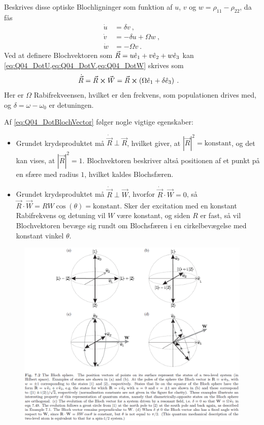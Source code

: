 Beskrives disse optiske Blochligninger som funktion af $u$, $v$ og $w = \rho_{11} - \rho_{22}$, da fås
\begin{align}
    \Dot{u} &= \delta v \: , \label{eq:Q04_DotU} \\
    \Dot{v} &= -\delta u + \Omega w \: , \label{eq:Q04_DotV} \\
    \Dot{w} &= -\Omega v \: . \label{eq:Q04_DotW}
\end{align}
Ved at definere \textsf{Blochvektoren} som $\Vec{R} = u\Hat{e}_1 + v\Hat{e}_2 + w\Hat{e}_3$ kan \cref{eq:Q04_DotU,eq:Q04_DotV,eq:Q04_DotW} skrives som
\begin{align} \label{eq:Q04_DotBlochVector}
    \Dot{\Vec{R}} &= \Vec{R} \cross \Vec{W} = \Vec{R} \cross \left(\Omega\Hat{e}_1 + \delta\Hat{e}_3\right) \: .
\end{align}
Her er $\Omega$ Rabifrekveensen, hvilket er den frekvens, som populationen drives med, og $\delta = \omega - \omega_0$ er detuningen.

Af \cref{eq:Q04_DotBlochVector} følger nogle vigtige egenskaber:
\begin{itemize}
    \item Grundet krydsproduktet må $\Dot{\Vec{R}} \perp \Vec{R}$, hvilket giver, at $|\Vec{R}|^2 = \text{konstant}$, og det kan vises, at $|\Vec{R}|^2 = 1$. Blochvektoren beskriver altså positionen af et punkt på en sfære med radius $1$, hvilket kaldes Blochsfæren.
    \item Grundet krydsproduktet må $\Dot{\Vec{R}} \perp \Vec{W}$, hvorfor $\Dot{\Vec{R}} \cdot \Vec{W} = 0$, så $\Vec{R} \cdot \Vec{W} = RW\cos(\theta) = \text{konstant}$. Sker der excitation med en konstant Rabifrekvens og detuning vil $W$ være konstant, og siden $R$ er fast, så vil Blochvektoren bevæge sig rundt om Blochsfæren i en cirkelbevægelse med konstant vinkel $\theta$.
\end{itemize}

\begin{figure}[!h]
    \centering
    \includegraphics[width=\textwidth]{Q04/images/BlochSphere.PNG}
    \caption{}
    \label{fig:Q04_BlochSphere}
\end{figure}


